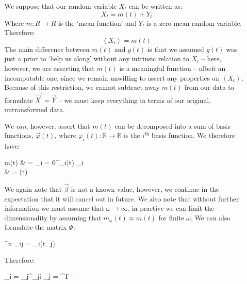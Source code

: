 \documentclass[]{article}
\def\llangle{\left\langle}
\def\rrangle{\right\rangle}
\newcommand\E[1]{\llangle #1 \rrangle}
\begin{document}
		We suppose that our random variable $X_t$ can be written as:
		\begin{equation}
			X_t = m(t) + Y_t
		\end{equation}
		Where $m:R \to R$ is the `mean function' and $Y_t$ is a zero-mean random variable. Therefore:
		\begin{equation}
			\E{X_t} = m(t)
		\end{equation}
		The main difference between $m(t)$ and $g(t)$ is that we assumed $g(t)$ was just a prior to `help us along' without any intrinsic relation to $X_t$ -- here, however, we are asserting that $m(t)$ is a meaningful function -- albeit an incomputable one, since we remain unwilling to assert any properties on $\E{X_t}$. Because of this restriction, we cannot subtract away $m(t)$ from our data to formulate $\vec{X}^\prime = \vec{Y}$ -- we must keep everything in terms of our original, untransformed data.

		We \textit{can}, however, assert that $m(t)$ can be decomposed into a sum of basis functions, $\vec{\varphi}(t)$, where $\varphi_i(t): \mathbb{R} \to \mathbb{R}$ is the $i^\text{th}$ basis function. We therefore have:
		\begin{spalign}
			m(t) & = \sum_{i = 0}^\omega \phi_i(t) \beta_i
			\\
			& = \vec{\beta} \cdot \vec{\varphi}(t)
		\end{spalign}
		We again note that $\vec{\beta}$ is not a known value, however, we continue in the expectation that it will cancel out in future. We also note that without further information we must assume that $\omega \to \infty$, in practive we can limit the dimensionality by assuming that $m_\omega(t) \approx m(t)$ for finite $\omega$. We can also formulate the matrix $\Phi$:
		\begin{spalign}
			\Phi \in {}^{\omega\times n}  \Phi_{ij} = \varphi_i(t_j)
		\end{spalign}
		Therefore:
		\begin{spalign}
			_i = \sum_{j}^\omega \Phi_{ji} \beta_j \LLR {} = \Phi^T \vec{\beta} + \vec{Y}
		\end{spalign}
		
\end{document}
